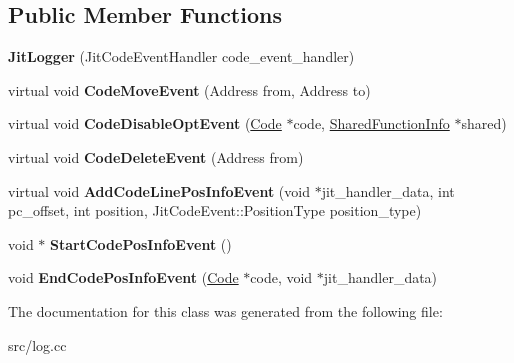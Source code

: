 \subsection*{Public Member Functions}
\begin{DoxyCompactItemize}
\item 
\hypertarget{classv8_1_1internal_1_1_jit_logger_ae534faff27b42623919bbe97d4625781}{}{\bfseries Jit\+Logger} (Jit\+Code\+Event\+Handler code\+\_\+event\+\_\+handler)\label{classv8_1_1internal_1_1_jit_logger_ae534faff27b42623919bbe97d4625781}

\item 
\hypertarget{classv8_1_1internal_1_1_jit_logger_ace3d6a203c3ecf8d77ecbb33f8996e61}{}virtual void {\bfseries Code\+Move\+Event} (Address from, Address to)\label{classv8_1_1internal_1_1_jit_logger_ace3d6a203c3ecf8d77ecbb33f8996e61}

\item 
\hypertarget{classv8_1_1internal_1_1_jit_logger_a083062ab13502383cceb32815cdb707f}{}virtual void {\bfseries Code\+Disable\+Opt\+Event} (\hyperlink{classv8_1_1internal_1_1_code}{Code} $\ast$code, \hyperlink{classv8_1_1internal_1_1_shared_function_info}{Shared\+Function\+Info} $\ast$shared)\label{classv8_1_1internal_1_1_jit_logger_a083062ab13502383cceb32815cdb707f}

\item 
\hypertarget{classv8_1_1internal_1_1_jit_logger_a14a28defd6ceaed49e98b96bcabe101c}{}virtual void {\bfseries Code\+Delete\+Event} (Address from)\label{classv8_1_1internal_1_1_jit_logger_a14a28defd6ceaed49e98b96bcabe101c}

\item 
\hypertarget{classv8_1_1internal_1_1_jit_logger_af2076ae625c31e5165653dde71a30e49}{}virtual void {\bfseries Add\+Code\+Line\+Pos\+Info\+Event} (void $\ast$jit\+\_\+handler\+\_\+data, int pc\+\_\+offset, int position, Jit\+Code\+Event\+::\+Position\+Type position\+\_\+type)\label{classv8_1_1internal_1_1_jit_logger_af2076ae625c31e5165653dde71a30e49}

\item 
\hypertarget{classv8_1_1internal_1_1_jit_logger_ae521e7d5d7de523dd5fd5a57b1f39907}{}void $\ast$ {\bfseries Start\+Code\+Pos\+Info\+Event} ()\label{classv8_1_1internal_1_1_jit_logger_ae521e7d5d7de523dd5fd5a57b1f39907}

\item 
\hypertarget{classv8_1_1internal_1_1_jit_logger_a3a31baf354b44d2dbff0a2924a6423db}{}void {\bfseries End\+Code\+Pos\+Info\+Event} (\hyperlink{classv8_1_1internal_1_1_code}{Code} $\ast$code, void $\ast$jit\+\_\+handler\+\_\+data)\label{classv8_1_1internal_1_1_jit_logger_a3a31baf354b44d2dbff0a2924a6423db}

\end{DoxyCompactItemize}


The documentation for this class was generated from the following file\+:\begin{DoxyCompactItemize}
\item 
src/log.\+cc\end{DoxyCompactItemize}
